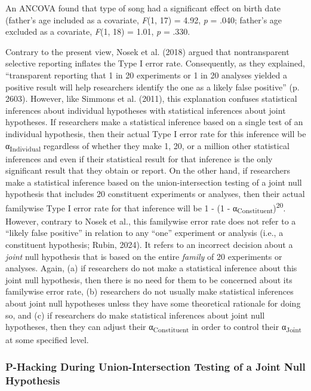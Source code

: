 \documentclass[authordate, meta]{jote-new-article}
\begin{document}
	An ANCOVA found that type of song had a significant effect on birth date (father's age included as a covariate, \emph{F}(1, 17) = 4.92, \emph{p} = .040; father's age excluded as a covariate, \emph{F}(1, 18) = 1.01, \emph{p} = .330.



	Contrary to the present view, Nosek et al. (2018) argued that nontransparent selective reporting inflates the Type I error rate. Consequently, as they explained, “transparent reporting that 1 in 20 experiments or 1 in 20 analyses yielded a positive result will help researchers identify the one as a likely false positive” (p. 2603). However, like Simmons et al. (2011), this explanation confuses statistical inferences about individual hypotheses with statistical inferences about joint hypotheses. If researchers make a statistical inference based on a single test of an individual hypothesis, then their actual Type I error rate for this inference will be α\textsubscript{Individual} regardless of whether they make 1, 20, or a million other statistical inferences and even if their statistical result for that inference is the only significant result that they obtain or report. On the other hand, if researchers make a statistical inference based on the union-intersection testing of a joint null hypothesis that includes 20 constituent experiments or analyses, then their actual familywise Type I error rate for that inference will be 1 - (1 - α\textsubscript{Constituent})\textsuperscript{20}. However, contrary to Nosek et al., this familywise error rate does not refer to a “likely false positive” in relation to any “one” experiment or analysis (i.e., a constituent hypothesis; Rubin, 2024). It refers to an incorrect decision about a \emph{joint} null hypothesis that is based on the entire\emph{ family} of 20 experiments or analyses. Again, (a) if researchers do not make a statistical inference about this joint null hypothesis, then there is no need for them to be concerned about its familywise error rate, (b) researchers do not usually make statistical inferences about joint null hypotheses unless they have some theoretical rationale for doing so, and (c) if researchers do make statistical inferences about joint null hypotheses, then they can adjust their α\textsubscript{Constituent} in order to control their α\textsubscript{Joint} at some specified level.



	\subsubsection{P-Hacking During Union-Intersection Testing of a Joint Null Hypothesis}
\end{document}

